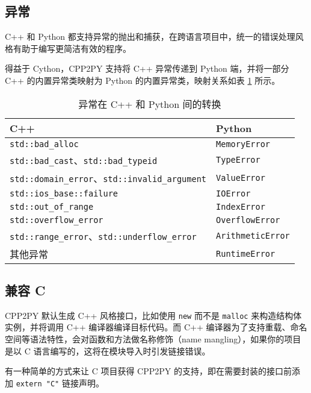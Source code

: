 \subsection{异常}

C++ 和 Python 都支持异常的抛出和捕获，在跨语言项目中，统一的错误处理风格有助于编写更简洁有效的程序。

得益于 Cython，CPP2PY 支持将 C++ 异常传递到 Python 端，并将一部分 C++ 的内置异常类映射为 Python 的内置异常类，映射关系如表 \ref{tab:3.4} 所示。

\begin{table}
  \centering
  \caption{异常在 C++ 和 Python 间的转换}
  \begin{tabular}{ll}
    \toprule
     C++                                           &  Python            \\
    \midrule
     \lstinline$std::bad_alloc$                              &  \lstinline$MemoryError$     \\
     \lstinline$std::bad_cast$、\lstinline$std::bad_typeid$            &  \lstinline$TypeError$       \\
     \lstinline$std::domain_error$、\lstinline$std::invalid_argument$  &  \lstinline$ValueError$      \\
     \lstinline$std::ios_base::failure$                      &  \lstinline$IOError$         \\
     \lstinline$std::out_of_range$                           &  \lstinline$IndexError$      \\
     \lstinline$std::overflow_error$                         &  \lstinline$OverflowError$   \\
     \lstinline$std::range_error$、\lstinline$std::underflow_error$    &  \lstinline$ArithmeticError$ \\
     其他异常                                      &  \lstinline$RuntimeError$    \\
    \bottomrule
  \end{tabular}
  \label{tab:3.4}
\end{table}


\subsection{兼容 C}

CPP2PY 默认生成 C++ 风格接口，比如使用 \lstinline{new} 而不是 \lstinline{malloc} 来构造结构体实例，并将调用 C++ 编译器编译目标代码。而 C++ 编译器为了支持重载、命名空间等语法特性，会对函数和方法做名称修饰（name mangling），如果你的项目是以 C 语言编写的，这将在模块导入时引发链接错误。

有一种简单的方式来让 C 项目获得 CPP2PY 的支持，即在需要封装的接口前添加 \lstinline{extern "C"} 链接声明。